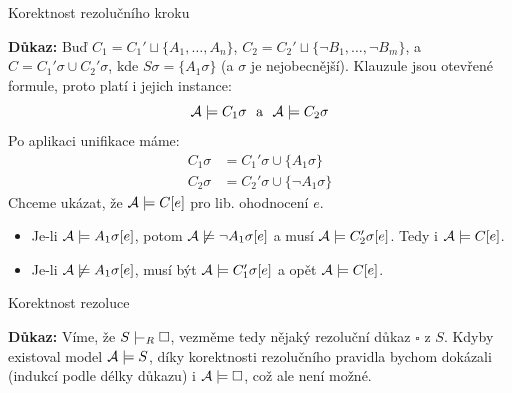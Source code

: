 \documentclass{beamer}
\begin{document}
\begin{frame}{Korektnost rezolučního kroku}

    \pause

    \pause
    \textbf{Důkaz:} Buď $C_1=C_1'\sqcup \{A_1,\dots,A_n\}$, $C_2=C_2'\sqcup \{\neg B_1,\dots,\neg B_m\}$, a $C=C_1'\sigma \cup C_2'\sigma$, kde $S\sigma=\{A_1\sigma\}$ (a $\sigma$ je
    nejobecnější). \pause Klauzule jsou otevřené formule, proto platí i jejich instance:     
    $$
    \A\models C_1\sigma\ \text{ a }\ \A\models C_2\sigma
    $$     
    \pause Po aplikaci unifikace máme: \pause
    \begin{align*}        
        C_1\sigma&=C_1'\sigma \cup \{A_1\sigma\} \\ 
        C_2\sigma&=C_2'\sigma \cup \{\neg A_1\sigma\}      
    \end{align*}
    \pause Chceme ukázat, že $\mathcal{A}\models C[e]$ pro lib. ohodnocení $e$.
    \begin{itemize}
        \item \pause Je-li \alert{$\mathcal{A}\models A_1\sigma[e]$}, potom $\mathcal{A}\not\models\neg A_1\sigma[e]$ a musí \alert{$\mathcal{A}\models C_2'\sigma[e]$}. Tedy i $\mathcal{A}\models C[e]$. \pause
        \item Je-li \alert{$\mathcal{A}\not\models A_1\sigma[e]$}, musí být \alert{$\mathcal{A}\models C_1'\sigma[e]$} a opět $\mathcal{A}\models C[e]$. \hfill\qedsymbol
    \end{itemize}    

\end{frame}


\begin{frame}{Korektnost rezoluce}

    \pause

    \medskip

    \pause
    \textbf{Důkaz:}
        Víme, že $S\proves_R\square$, vezměme tedy nějaký rezoluční důkaz $\square$ z $S$. \pause Kdyby existoval model $\mathcal{A}\models S$, díky korektnosti rezolučního pravidla bychom dokázali (indukcí podle délky důkazu) i $\mathcal{A}\models\square$, \pause což ale není možné. \hfill\qedsymbol

\end{frame}
\end{document}
